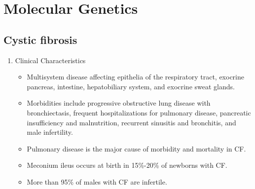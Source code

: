 \documentclass[12pt]{scrartcl}
\begin{document}
\section{Molecular Genetics}
\label{sec:org923c272}
\subsection{Cystic fibrosis}
\label{sec:org9e5bae0}
\begin{enumerate}
\item Clinical Characteristics
\label{sec:orgdb05e39}
\begin{itemize}
\item Multisystem disease affecting epithelia of the respiratory tract, exocrine pancreas, intestine, hepatobiliary system, and exocrine sweat glands.
\item Morbidities include progressive obstructive lung disease with bronchiectasis, frequent hospitalizations for pulmonary disease, pancreatic insufficiency and malnutrition, recurrent sinusitis and bronchitis, and male infertility.
\item Pulmonary disease is the major cause of morbidity and mortality in CF.
\item Meconium ileus occurs at birth in 15\%-20\% of newborns with CF.
\item More than 95\% of males with CF are infertile.
\end{itemize}


\end{enumerate}
\end{document}
